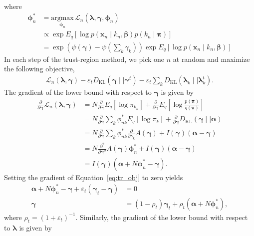 \documentclass[a4paper]{article}
\begin{document}
		where
		\begin{align}
			\bm{\phi}_n^*
			&= \underset{\bm{\phi}_n}{\text{argmax}} \, \mathcal{L}_n(\bm{\lambda}, \bm{\gamma}, \bm{\phi}_n) \\
			&\propto \exp E_q\left[ \log p(\mathbf{x}_n \mid k_n, \bm{\beta}) p(k_n \mid \bm{\pi}) \right] \\
			&= \exp \left( \psi(\bm{\gamma}) - \psi\left(\sum_k \gamma_k\right) \right) \exp E_q\left[ \log p(\mathbf{x}_n \mid k_n, \bm{\beta}) \right]
		\end{align}
		In each step of the trust-region method, we pick one $n$ at random and maximize the following objective,
		\begin{align}
			\label{eq:tr_obj}
			\mathcal{L}_n(\bm{\lambda}, \bm{\gamma}) - \varepsilon_t D_\text{KL}(\bm{\gamma} \mid\mid \bm{\gamma}^t) - \varepsilon_t \sum_k D_\text{KL}(\bm{\lambda}_k \mid\mid \bm{\lambda}_k^t).
		\end{align}
		The gradient of the lower bound with respect to $\bm{\gamma}$ is given by
		\begin{align}
			\frac{\partial}{\partial \bm{\gamma}} \mathcal{L}_n(\bm{\lambda}, \bm{\gamma})
			&= N \frac{\partial}{\partial \bm{\gamma}} E_q\left[ \log \pi_{k_n} \right]
			+ \frac{\partial}{\partial \bm{\gamma}} E_q\left[ \log \frac{p(\bm{\pi})}{q(\bm{\pi})} \right] \\
			&= N \frac{\partial}{\partial \bm{\gamma}} \sum_k \phi_{nk}^* E_q\left[ \log \pi_k \right]
			+ \frac{\partial}{\partial \bm{\gamma}} D_\text{KL}( \bm{\gamma} \mid\mid \bm{\alpha} ) \\
			&= N \frac{\partial}{\partial \bm{\gamma}} \sum_k \phi_{nk}^* \frac{\partial}{\partial \gamma_k} A(\bm{\gamma})
			+ I(\bm{\gamma}) (\bm{\alpha} - \bm{\gamma})  \\
			&= N \frac{\partial^2}{\partial \bm{\gamma}^2} A(\bm{\gamma}) \bm{\phi}_{n}^*
			+ I(\bm{\gamma}) (\bm{\alpha} - \bm{\gamma})  \\
			&= I(\bm{\gamma}) (\bm{\alpha} + N \bm{\phi}_{n}^* - \bm{\gamma}).
		\end{align}
		Setting the gradient of Equation~\ref{eq:tr_obj} to zero yields
		\begin{align}
			\bm{\alpha} + N \bm{\phi}_{n}^* - \bm{\gamma} + \varepsilon_t (\bm{\gamma}_t - \bm{\gamma}) &= 0 \\
			\bm{\gamma} &= (1 - \rho_t) \bm{\gamma}_t + \rho_t (\bm{\alpha} + N\bm{\phi}_n^*),
		\end{align}
		where $\rho_t = (1 + \varepsilon_t)^{-1}$. Similarly, the gradient of the lower bound with respect to $\bm{\lambda}$ is given by
\end{document}
